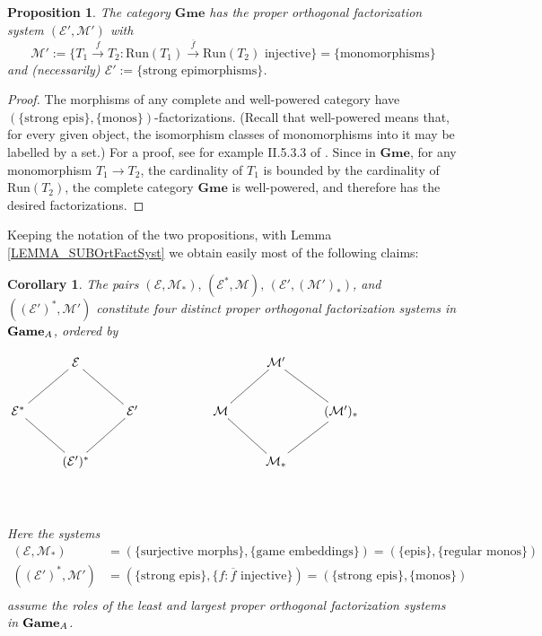 \documentclass[12pt]{amsart}
\newtheorem{prop}[thm]{Proposition}
\newtheorem{cor}[thm]{Corollary}
\theoremstyle{definition}
\newcommand{\A}{\textup{\textmd{\textsc{A}}}}
\newcommand{\Games}{\mathbf{Game}}
\newcommand{\Gmes}{\mathbf{Gme}}
\begin{document}
\begin{prop}\label{PROP_GmesRegMonFact}	
	The category $\Gmes$ has the proper orthogonal factorization system $(\mathcal E',\mathcal M')$ with $$\mathcal M':=\{T_1\stackrel{f}{\to}T_2:\mathrm{Run}(T_1)\stackrel{\overline{f}}{\to}\mathrm{Run}(T_2) \text{  injective}\}=\{\text{monomorphisms}\}$$ and (necessarily) $\mathcal E':=\{\text{strong epimorphisms}\}$.
\end{prop}

\begin{proof}
	The morphisms of any complete and well-powered category have $(\{\text{strong epis}\},\{\text{monos}\})$-factorizations. (Recall that well-powered means that, for every given object, the isomorphism classes of monomorphisms into it may be labelled by a set.) For a proof, see for example II.5.3.3 of \cite{Hofmann2014}. Since in $\Gmes$, for any monomorphism $T_1\to T_2$, the cardinality of $T_1$ is bounded by the cardinality of $\mathrm{Run}(T_2)$, the complete category $\Gmes$ is well-powered, and therefore has the desired factorizations.
\end{proof}


Keeping the notation of the two propositions, with Lemma \ref{LEMMA_SUBOrtFactSyst} we obtain easily most of the following claims:
\begin{cor}\label{COR_ortfactsyst}
	The pairs $(\mathcal E,\mathcal M_*),\,(\mathcal E^*,\mathcal M),\, (\mathcal E',(\mathcal M' )_*)$, and $((\mathcal E')^*,\mathcal M')$ constitute four distinct proper orthogonal factorization systems in $\Games_\A$, ordered by
	\begin{center}
		$\xymatrix{& \mathcal E &&&& \mathcal M' & \\
			\mathcal E^*\ar@{-}[ur]\ar@{-}[dr] && \mathcal E'\ar@{-}[lu]\ar@{-}[ld] && \mathcal M\ar@{-}[ru]\ar@{-}[rd] && (\mathcal M')_*\ar@{-}[lu]\ar@{-}[ld]\\
			& (\mathcal E')^* &&&& \mathcal M_*\\\
		}$
	\end{center}
	Here the systems
	\begin{align*}
		(\mathcal E,\mathcal M_*)&=(\{\text{surjective morphs}\},\{\text{game embeddings}\})=(\{\text{epis}\},\{\text{regular monos}\})\\
		((\mathcal E')^*,\mathcal M')&=(\{\text{strong epis}\},\{f:\overline{f} \text{ injective}\})=(\{\text{strong epis}\},\{\text{monos}\})	\\
	\end{align*}
	assume the roles of the least and largest proper orthogonal factorization systems in $\Games_{\A}$.	
\end{cor}
\end{document}

